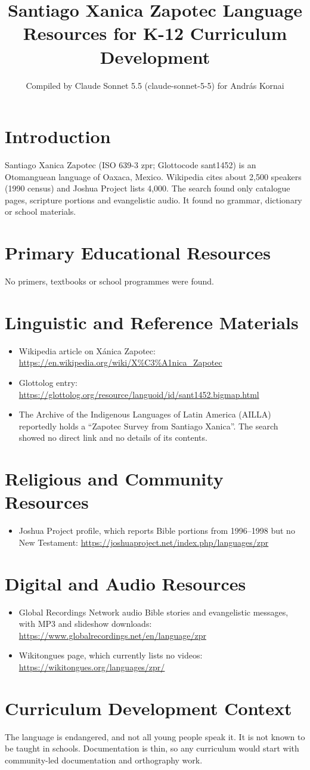 \documentclass[12pt]{article}
\title{Santiago Xanica Zapotec Language Resources for K-12 Curriculum Development}
\author{Compiled by Claude Sonnet 5.5 (claude-sonnet-5-5) for Andr\'as Kornai}
\date{}
\begin{document}
\maketitle

\section{Introduction}
Santiago Xanica Zapotec (ISO 639-3 zpr; Glottocode sant1452) is an Otomanguean language of Oaxaca, Mexico. Wikipedia cites about 2,500 speakers (1990 census) and Joshua Project lists 4,000. The search found only catalogue pages, scripture portions and evangelistic audio. It found no grammar, dictionary or school materials.

\section{Primary Educational Resources}
No primers, textbooks or school programmes were found.

\section{Linguistic and Reference Materials}
\begin{itemize}
\item Wikipedia article on X\'anica Zapotec: \url{https://en.wikipedia.org/wiki/X%C3%A1nica_Zapotec}
\item Glottolog entry: \url{https://glottolog.org/resource/languoid/id/sant1452.bigmap.html}
\item The Archive of the Indigenous Languages of Latin America (AILLA) reportedly holds a ``Zapotec Survey from Santiago Xanica''. The search showed no direct link and no details of its contents.
\end{itemize}

\section{Religious and Community Resources}
\begin{itemize}
\item Joshua Project profile, which reports Bible portions from 1996--1998 but no New Testament: \url{https://joshuaproject.net/index.php/languages/zpr}
\end{itemize}

\section{Digital and Audio Resources}
\begin{itemize}
\item Global Recordings Network audio Bible stories and evangelistic messages, with MP3 and slideshow downloads: \url{https://www.globalrecordings.net/en/language/zpr}
\item Wikitongues page, which currently lists no videos: \url{https://wikitongues.org/languages/zpr/}
\end{itemize}

\section{Curriculum Development Context}
The language is endangered, and not all young people speak it. It is not known to be taught in schools. Documentation is thin, so any curriculum would start with community-led documentation and orthography work.
\end{document}

